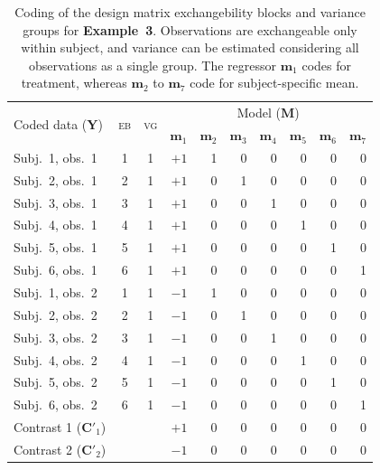 \begin{table}[!t]
\caption[Coding for Example 3]{Coding of the design matrix exchangebility blocks and variance groups for \textbf{Example~3}. Observations are exchangeable only within subject, and variance can be estimated considering all observations as a single group. The regressor $\mathbf{m}_1$ codes for treatment, whereas $\mathbf{m}_2$ to $\mathbf{m}_7$ code for subject-specific mean.}
\begin{center}
{\small
\begin{tabular}{@{}lccrrrrrrr@{}}
\toprule
\multirow{2}{*}{\vspace*{-1.7mm}Coded data ($\mathbf{Y}$)} & \multirow{2}{*}{\vspace*{-1.7mm}\textsc{eb}} & \multirow{2}{*}{\vspace*{-1.7mm}\textsc{vg}} & \multicolumn{7}{c}{Model ($\mathbf{M}$)\hspace*{-3mm}}\\
\cmidrule(l){4-10}
& & & $\mathbf{m}_1$ & $\mathbf{m}_2$ & $\mathbf{m}_3$ & $\mathbf{m}_4$& $\mathbf{m}_5$ & $\mathbf{m}_6$ & $\mathbf{m}_7$\\
\midrule
Subj.\ 1, obs.\ 1  & 1 & 1 & $+1$ & 1 & 0 & 0 & 0 & 0 & 0\\
Subj.\ 2, obs.\ 1  & 2 & 1 & $+1$ & 0 & 1 & 0 & 0 & 0 & 0\\
Subj.\ 3, obs.\ 1  & 3 & 1 & $+1$ & 0 & 0 & 1 & 0 & 0 & 0\\
Subj.\ 4, obs.\ 1  & 4 & 1 & $+1$ & 0 & 0 & 0 & 1 & 0 & 0\\
Subj.\ 5, obs.\ 1  & 5 & 1 & $+1$ & 0 & 0 & 0 & 0 & 1 & 0\\
Subj.\ 6, obs.\ 1  & 6 & 1 & $+1$ & 0 & 0 & 0 & 0 & 0 & 1\\
Subj.\ 1, obs.\ 2  & 1 & 1 & $-1$ & 1 & 0 & 0 & 0 & 0 & 0\\
Subj.\ 2, obs.\ 2  & 2 & 1 & $-1$ & 0 & 1 & 0 & 0 & 0 & 0\\ 
Subj.\ 3, obs.\ 2  & 3 & 1 & $-1$ & 0 & 0 & 1 & 0 & 0 & 0\\ 
Subj.\ 4, obs.\ 2  & 4 & 1 & $-1$ & 0 & 0 & 0 & 1 & 0 & 0\\
Subj.\ 5, obs.\ 2  & 5 & 1 & $-1$ & 0 & 0 & 0 & 0 & 1 & 0\\
Subj.\ 6, obs.\ 2  & 6 & 1 & $-1$ & 0 & 0 & 0 & 0 & 0 & 1\\
\midrule
Contrast 1 ($\mathbf{C}'_1$) & & & $+1$ & 0 & 0 & 0 & 0 & 0 & 0\\
Contrast 2 ($\mathbf{C}'_2$) & & & $-1$ & 0 & 0 & 0 & 0 & 0 & 0\\
\bottomrule
\end{tabular}}
\end{center}
\label{tab:ex_pairedttest}
\end{table}

